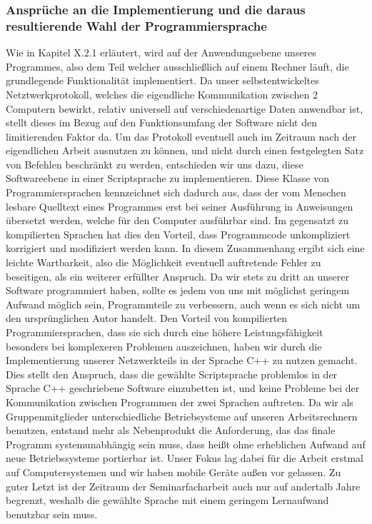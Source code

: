 \documentclass[12pt, a4paper]{scrartcl}
\begin{document}
\subsubsection{Ansprüche an die Implementierung und die daraus resultierende Wahl der Programmiersprache}
Wie in Kapitel X.2.1 erläutert, wird auf der Anwendungsebene unseres Programmes, also dem Teil welcher ausschließlich auf einem Rechner läuft, die grundlegende Funktionalität implementiert. Da unser selbstentwickeltes Netztwerkprotokoll, welches die eigendliche Kommunikation zwischen 2 Computern bewirkt, relativ universell auf verschiedenartige Daten anwendbar ist, stellt dieses im Bezug auf den Funktionsumfang der Software nicht den limitierenden Faktor da. Um das Protokoll eventuell auch im Zeitraum nach der eigendlichen Arbeit ausnutzen zu können, und nicht durch einen festgelegten Satz von Befehlen beschränkt zu werden, entschieden wir uns dazu, diese Softwareebene in einer Scriptsprache zu implementieren. Diese Klasse von Programmiersprachen kennzeichnet sich dadurch aus, dass der vom Menschen lesbare Quelltext eines Programmes erst bei seiner Ausführung in Anweisungen übersetzt werden, welche für den Computer ausführbar sind. Im gegensatzt zu kompilierten Sprachen hat dies den Vorteil, dass Programmcode unkompliziert korrigiert und modifiziert werden kann. In diesem Zusammenhang ergibt sich eine leichte Wartbarkeit, also die Möglichkeit eventuell auftretende Fehler zu beseitigen, als ein weiterer erfüllter Anspruch. Da wir stets zu dritt an unserer Software programmiert haben, sollte es jedem von uns mit möglichst geringem Aufwand möglich sein, Programmteile zu verbessern, auch wenn es sich nicht um den ursprünglichen Autor handelt.
Den Vorteil von kompilierten Programmiersprachen, dass sie sich durch eine höhere Leistungsfähigkeit besonders bei komplexeren Problemen auszeichnen, haben wir durch die Implementierung unserer Netzwerkteils in der Sprache C++ zu nutzen gemacht. Dies stellt den Anspruch, dass die gewählte Scriptsprache problemlos in der Sprache C++ geschriebene Software einzubetten ist, und keine Probleme bei der Kommunikation zwischen Programmen der zwei Sprachen auftreten.
Da wir als Gruppenmitglieder unterschiedliche Betriebsysteme auf unseren Arbeitsrechnern benutzen, entstand mehr als Nebenprodukt die Anforderung, das das finale Programm systemunabhängig sein muss, dass heißt ohne erheblichen Aufwand auf neue Betriebssysteme portierbar ist. Unser Fokus lag dabei für die Arbeit erstmal auf Computersystemen und wir haben mobile Geräte außen vor gelassen.
Zu guter Letzt ist der Zeitraum der Seminarfacharbeit auch nur auf andertalb Jahre begrenzt, weshalb die gewählte Sprache mit einem geringem Lernaufwand benutzbar sein muss.\\
\end{document}
